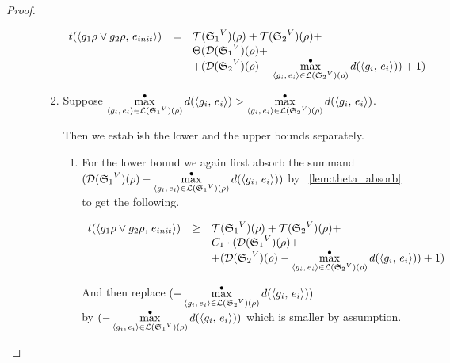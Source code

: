 \begin{proof}
\begin{enumerate}
\begin{enumerate}
\begin{enumerate}
   		\[ \begin{array}{lcl}
		t(\langle g_1 \rho \lor g_2 \rho ,\, e_{init} \rangle) &=& \mathcal{T}({\mathfrak{S}_1}^{V})(\rho) + \mathcal{T}({\mathfrak{S}_2}^{V})(\rho) + \\
		& & \Theta(\mathcal{D}({\mathfrak{S}_1}^{V})(\rho) + \\
		& & + (\mathcal{D}({\mathfrak{S}_2}^{V})(\rho) - \max^{\bullet}\limits_{\langle g_i ,\, e_i \rangle \in \mathcal{L}({\mathfrak{S}_2}^{V})(\rho)} d(\langle g_i ,\, e_i \rangle)) + 1) \\
		\end{array} \]
		
		\item Suppose $\max^{\bullet}\limits_{\langle g_i ,\, e_i \rangle \in \mathcal{L}({\mathfrak{S}_1}^{V})(\rho)} d(\langle g_i ,\, e_i \rangle) > \max^{\bullet}\limits_{\langle g_i ,\, e_i \rangle \in \mathcal{L}({\mathfrak{S}_2}^{V})(\rho)} d(\langle g_i ,\, e_i \rangle)$.
		
		Then we establish the lower and the upper bounds separately.
		
			\begin{enumerate}
   			\item For the lower bound we again first absorb the summand $(\mathcal{D}({\mathfrak{S}_1}^{V})(\rho) - \max^{\bullet}\limits_{\langle g_i ,\, e_i \rangle \in \mathcal{L}({\mathfrak{S}_1}^{V})(\rho)} d(\langle g_i ,\, e_i \rangle))$ by \lemmaword~\ref{lem:theta_absorb} to get the following.

			\[ \begin{array}{lcl}
			t(\langle g_1 \rho \lor g_2 \rho ,\, e_{init} \rangle) &\ge& \mathcal{T}({\mathfrak{S}_1}^{V})(\rho) + \mathcal{T}({\mathfrak{S}_2}^{V})(\rho) + \\
			& & C_1 \cdot (\mathcal{D}({\mathfrak{S}_1}^{V})(\rho) + \\
			& & + (\mathcal{D}({\mathfrak{S}_2}^{V})(\rho) - \max^{\bullet}\limits_{\langle g_i ,\, e_i \rangle \in \mathcal{L}({\mathfrak{S}_2}^{V})(\rho)} d(\langle g_i ,\, e_i \rangle)) + 1) \\
			\end{array} \]		
		
			And then replace $(- \max^{\bullet}\limits_{\langle g_i ,\, e_i \rangle \in \mathcal{L}({\mathfrak{S}_2}^{V})(\rho)} d(\langle g_i ,\, e_i \rangle))$ \\ by $(- \max^{\bullet}\limits_{\langle g_i ,\, e_i \rangle \in \mathcal{L}({\mathfrak{S}_1}^{V})(\rho)} d(\langle g_i ,\, e_i \rangle))$ which is smaller by assumption.
		

\end{enumerate}
\end{enumerate}
\end{enumerate}
\end{enumerate}
\end{proof}
